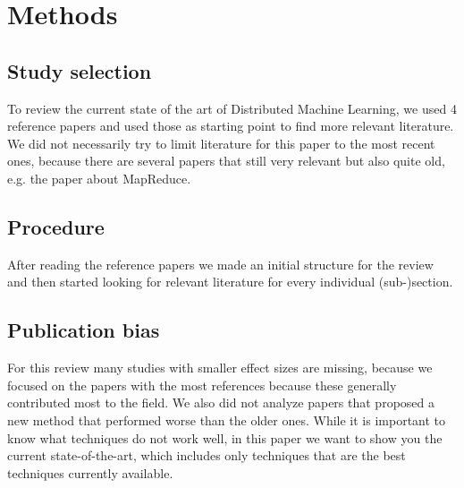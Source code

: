 \section{Methods}


\subsection{Study selection}
To review the current state of the art of Distributed Machine Learning, we used 4 reference papers\cite{Bal12}\cite{Die12}\cite{Xing16}\cite{Zhang16} and used those as starting point to find more relevant literature. We did not necessarily try to limit literature for this paper to the most recent ones, because there are several papers that still very relevant but also quite old, e.g. the paper about MapReduce\cite{Dean04}.
\subsection{Procedure}
After reading the reference papers \cite{Bal12}\cite{Die12}\cite{Xing16}\cite{Zhang16} we made an initial structure for the review and then started looking for relevant literature for every individual (sub-)section.
\subsection{Publication bias}
For this review many studies with smaller effect sizes are missing, because we focused on the papers with the most references because these generally contributed most to the field. We also did not analyze papers that proposed a new method that performed worse than the older ones. While it is important to know what techniques do not work well, in this paper we want to show you the current state-of-the-art, which includes only techniques that are the best techniques currently available.